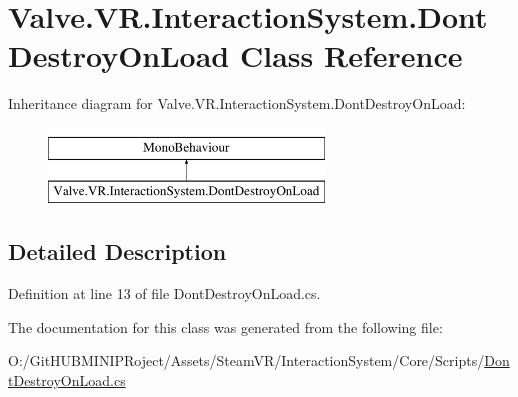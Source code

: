 \hypertarget{class_valve_1_1_v_r_1_1_interaction_system_1_1_dont_destroy_on_load}{}\section{Valve.\+V\+R.\+Interaction\+System.\+Dont\+Destroy\+On\+Load Class Reference}
\label{class_valve_1_1_v_r_1_1_interaction_system_1_1_dont_destroy_on_load}
Inheritance diagram for Valve.\+V\+R.\+Interaction\+System.\+Dont\+Destroy\+On\+Load\+:\begin{figure}[H]
\begin{center}
\leavevmode
\includegraphics[height=2.000000cm]{class_valve_1_1_v_r_1_1_interaction_system_1_1_dont_destroy_on_load}
\end{center}
\end{figure}


\subsection{Detailed Description}


Definition at line 13 of file Dont\+Destroy\+On\+Load.\+cs.



The documentation for this class was generated from the following file\+:\begin{DoxyCompactItemize}
\item 
O\+:/\+Git\+H\+U\+B\+M\+I\+N\+I\+P\+Roject/\+Assets/\+Steam\+V\+R/\+Interaction\+System/\+Core/\+Scripts/\mbox{\hyperlink{_dont_destroy_on_load_8cs}{Dont\+Destroy\+On\+Load.\+cs}}\end{DoxyCompactItemize}
